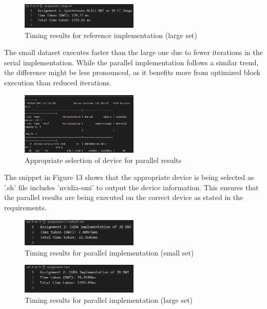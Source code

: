 \documentclass[journal,11pt]{IEEEtran}
\begin{document}
\begin{figure}[h]
    \centering
    \includegraphics[width=0.5\textwidth]{assets/1-large.png}
    \caption{Timing results for reference implementation (large set)}
    \label{fig:12}
\end{figure}

The small dataset executes faster than the large one due to fewer iterations in the serial implementation. While the parallel implementation follows a similar trend, the difference might be less pronounced, as it benefits more from optimized block execution than reduced iterations.

\begin{figure}[h]
    \centering
    \includegraphics[width=0.5\textwidth]{assets/correct-device.png}
    \caption{Appropriate selection of device for parallel results}
    \label{fig:13}
\end{figure}

The snippet in Figure 13 shows that the appropriate device is being selected as '.sh' file includes 'nvidia-smi' to output the device information. This ensures that the parallel results are being executed on the correct device as stated in the requirements.

\begin{figure}[h]
    \centering
    \includegraphics[width=0.5\textwidth]{assets/2-subset.png}
    \caption{Timing results for parallel implementation (small set)}
    \label{fig:14}
\end{figure}

\begin{figure}[h]
    \centering
    \includegraphics[width=0.5\textwidth]{assets/2-large.png}
    \caption{Timing results for parallel implementation (large set)}
    \label{fig:15}
\end{figure}
\end{document}
